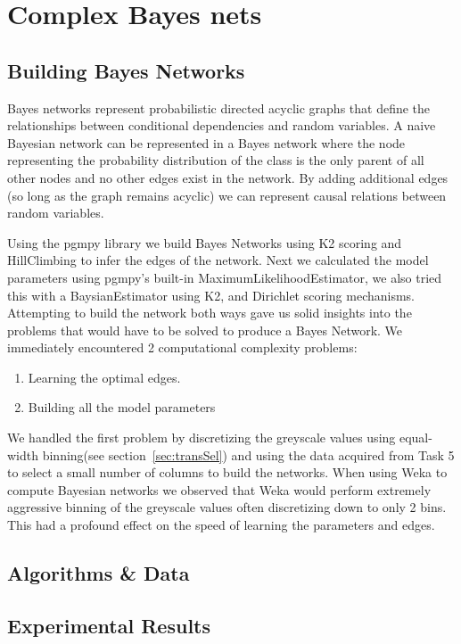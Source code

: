 \documentclass[11pt]{article}
\begin{document}
\section{Complex Bayes nets}
\subsection{Building Bayes Networks}
Bayes networks represent probabilistic directed acyclic graphs that define the relationships between conditional dependencies and random variables.
A naive Bayesian network can be represented in a Bayes network where the node representing the probability distribution of the class is the only parent of all other nodes and no other edges exist in the network. 
By adding additional edges (so long as the graph remains acyclic) we can represent causal relations between random variables.
\par
Using the pgmpy library we build Bayes Networks using K2 scoring and HillClimbing to infer the edges of the network. Next we calculated the model parameters using pgmpy's built-in MaximumLikelihoodEstimator, we also tried this with a BaysianEstimator using K2, and Dirichlet scoring mechanisms.
Attempting to build the network both ways gave us solid insights into the problems that would have to be solved to produce a Bayes Network.
We immediately encountered 2 computational complexity problems:
\begin{enumerate}
    \item Learning the optimal edges.
    \item Building all the model parameters
\end{enumerate}

We handled the first problem by discretizing the greyscale values using equal-width binning(see section~\ref{sec:transSel}) and using the data acquired from Task 5 to select a small number of columns to build the networks.
When using Weka to compute Bayesian networks we observed that Weka would perform extremely aggressive binning of the greyscale values often discretizing down to only 2 bins. This had a profound effect on the speed of learning the parameters and edges.

\subsection{Algorithms \& Data}


\subsection{Experimental Results}
\end{document}
